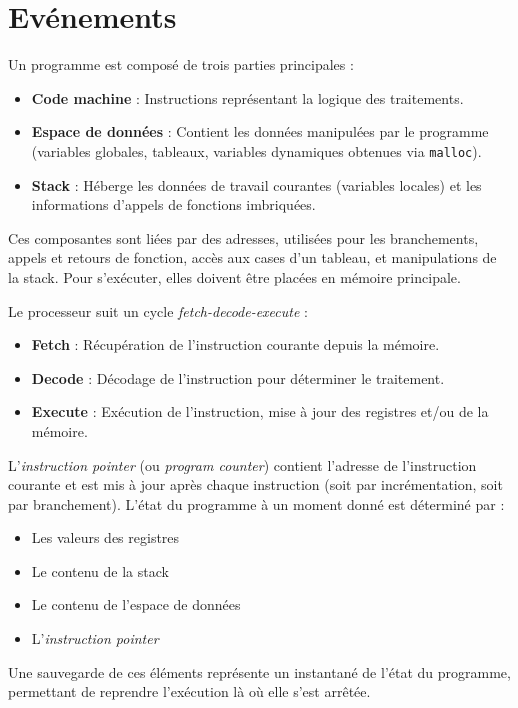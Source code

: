\section{Evénements}\label{sec:evenements}

Un programme est composé de trois parties principales :
\begin{itemize}
    \item \textbf{Code machine} : Instructions représentant la logique des traitements.
    \item \textbf{Espace de données} : Contient les données manipulées par le programme (variables globales, tableaux, variables dynamiques obtenues via \texttt{malloc}).
    \item \textbf{Stack} : Héberge les données de travail courantes (variables locales) et les informations d'appels de fonctions imbriquées.
\end{itemize}

Ces composantes sont liées par des adresses, utilisées pour les branchements, appels et retours de fonction, accès aux cases d'un tableau, et manipulations de la stack. Pour s'exécuter, elles doivent être placées en mémoire principale.

Le processeur suit un cycle \textit{fetch-decode-execute} :
\begin{itemize}
    \item \textbf{Fetch} : Récupération de l'instruction courante depuis la mémoire.
    \item \textbf{Decode} : Décodage de l'instruction pour déterminer le traitement.
    \item \textbf{Execute} : Exécution de l'instruction, mise à jour des registres et/ou de la mémoire.
\end{itemize}

L'\textit{instruction pointer} (ou \textit{program counter}) contient l'adresse de l'instruction courante et est mis à jour après chaque instruction (soit par incrémentation, soit par branchement). L'état du programme à un moment donné est déterminé par :
\begin{itemize}
    \item Les valeurs des registres
    \item Le contenu de la stack
    \item Le contenu de l'espace de données
    \item L'\textit{instruction pointer}
\end{itemize}

Une sauvegarde de ces éléments représente un instantané de l'état du programme, permettant de reprendre l'exécution là où elle s'est arrêtée.
